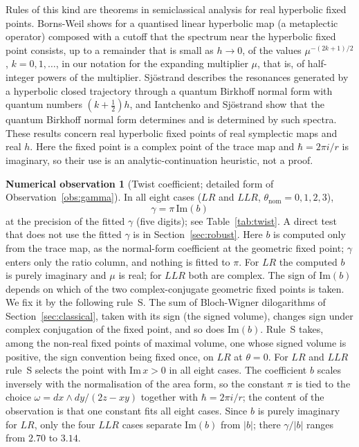 \documentclass[11pt]{amsart}
\theoremstyle{definition}
\newtheorem{observation}[conjecture]{Numerical observation}
\theoremstyle{remark}
\begin{document}
Rules of this kind are theorems in semiclassical analysis for real hyperbolic fixed
points. Borns-Weil \cite[Thm.~1]{BW} shows for a quantised linear hyperbolic map (a
metaplectic operator) composed with a cutoff that the spectrum near the hyperbolic
fixed point consists, up to a remainder that is small as $h \to 0$, of the values
$\mu^{-(2k+1)/2}$, $k = 0, 1, \dots$, in our notation for the expanding multiplier
$\mu$, that is, of half-integer powers of the multiplier. Sj\"ostrand \cite[Thms.~2.3
and~3.3]{Sj} describes the
resonances generated by a hyperbolic closed trajectory through a quantum Birkhoff
normal form with quantum numbers $(k+\frac12)h$, and Iantchenko and Sj\"ostrand
\cite[Thm.~3.2 and Section~4]{IS} show that the quantum Birkhoff normal form
determines and is determined by such spectra. These results concern real hyperbolic
fixed points of real symplectic maps and real $h$. Here the fixed point is a complex
point of the trace map and $\hbar = 2\pi i/r$ is imaginary, so their use is an
analytic-continuation heuristic, not a proof.

\begin{observation}[Twist coefficient; detailed form of
Observation~\ref{obs:gamma}]\label{obs:twist}
In all eight cases ($LR$ and $LLR$, $\theta_{\mathrm{nom}} = 0, 1, 2, 3$),
\[
\gamma = \pi\,\mathrm{Im}(b)
\]
at the precision of the fitted $\gamma$ (five digits); see Table~\ref{tab:twist}. A
direct test that does not use the fitted $\gamma$ is in Section~\ref{sec:robust}.
Here $b$ is computed only from the trace map, as the normal-form coefficient at the
geometric fixed point; $\gamma$ enters only the ratio column, and nothing is fitted to
$\pi$. For $LR$ the computed $b$ is purely imaginary and $\mu$ is real; for $LLR$ both
are complex. The sign of $\mathrm{Im}(b)$ depends on which of the two
complex-conjugate geometric fixed points is taken. We fix it by the following rule~S.
The sum of Bloch-Wigner dilogarithms of Section~\ref{sec:classical}, taken with its
sign (the signed volume), changes sign under complex conjugation of the fixed point,
and so does $\mathrm{Im}(b)$. Rule~S takes, among the non-real fixed points of maximal
volume, one whose signed volume is positive, the sign convention being fixed once, on
$LR$ at $\theta = 0$. For $LR$ and $LLR$ rule~S selects the point with
$\mathrm{Im}\,x > 0$ in all eight cases. The coefficient $b$ scales inversely with the normalisation of
the area form, so the constant $\pi$ is tied to the choice
$\omega = dx\wedge dy/(2z - xy)$ together with $\hbar = 2\pi i/r$; the content of the
observation is that one constant fits all eight cases. Since $b$ is purely imaginary
for $LR$, only the four $LLR$ cases separate $\mathrm{Im}(b)$ from $|b|$; there
$\gamma/|b|$ ranges from $2.70$ to $3.14$.
\end{observation}
\end{document}
